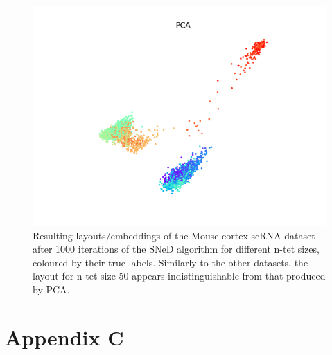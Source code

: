\documentclass{l4proj}
\begin{document}
\begin{appendices}
\begin{figure}[ht]
    \includegraphics[width=0.4\linewidth]{images/n-tet layouts/mouse RNA/pca.png}
    
    


    \caption{Resulting layouts/embeddings of the Mouse cortex scRNA dataset after 1000 iterations of the SNeD algorithm for different n-tet sizes, coloured by their true labels. Similarly to the other datasets, the layout for n-tet size 50 appears indistinguishable from that produced by PCA.
    }

    \label{fig:init_demo} 
\end{figure}


\chapter{Appendix C}
\label{appendix c}


\end{appendices}
\end{document}
